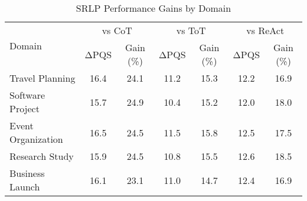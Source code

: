\begin{table}[htbp]
\centering
\caption{SRLP Performance Gains by Domain}
\label{tab:domain_gains}
\begin{tabular}{lcccccc}
\toprule
\multirow{2}{*}{Domain} & \multicolumn{2}{c}{vs CoT} & \multicolumn{2}{c}{vs ToT} & \multicolumn{2}{c}{vs ReAct} \\
\cmidrule(lr){2-3} \cmidrule(lr){4-5} \cmidrule(lr){6-7}
 & ΔPQS & Gain (\%) & ΔPQS & Gain (\%) & ΔPQS & Gain (\%) \\
\midrule
Travel Planning & 16.4 & 24.1 & 11.2 & 15.3 & 12.2 & 16.9 \\
Software Project & 15.7 & 24.9 & 10.4 & 15.2 & 12.0 & 18.0 \\
Event Organization & 16.5 & 24.5 & 11.5 & 15.8 & 12.5 & 17.5 \\
Research Study & 15.9 & 24.5 & 10.8 & 15.5 & 12.6 & 18.5 \\
Business Launch & 16.1 & 23.1 & 11.0 & 14.7 & 12.4 & 16.9 \\
\bottomrule
\end{tabular}
\end{table}